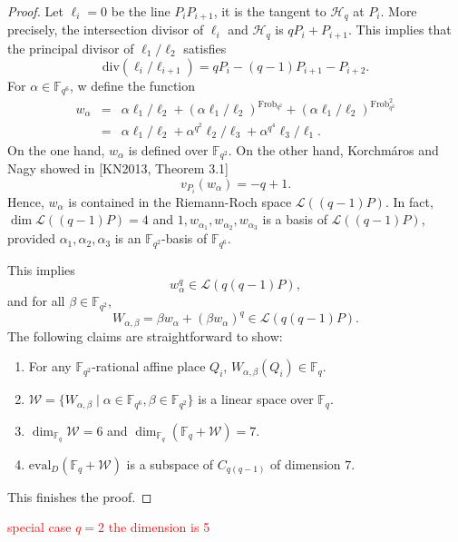 \documentclass[a4paper]{amsart}
\theoremstyle{plain}
\theoremstyle{definition}
\theoremstyle{remark}
\begin{document}
\begin{proof}
	Let $\ell_i=0$ be the line $P_iP_{i+1}$, it is the tangent to $\mathscr{H}_q$ at $P_i$. More precisely, the intersection divisor of $\ell_i$ and $\mathscr{H}_q$ is $qP_i+P_{i+1}$. This implies that the principal divisor of $\ell_1/\ell_2$ satisfies
	\[\mathrm{div}(\ell_i/\ell_{i+1})=qP_i-(q-1)P_{i+1}-P_{i+2}.\]
	For $\alpha \in \mathbb{F}_{q^6}$, w define the function
	\begin{eqnarray*}
		w_\alpha&=&\alpha\ell_1/\ell_2+(\alpha\ell_1/\ell_2)^{\mathrm{Frob}_{q^2}}+(\alpha\ell_1/\ell_2)^{\mathrm{Frob}_{q^2}^2}\\
		&=&\alpha\ell_1/\ell_2+\alpha^{q^2}\ell_2/\ell_3+\alpha^{q^4}\ell_3/\ell_1.
	\end{eqnarray*}
	On the one hand, $w_\alpha$ is defined over $\mathbb{F}_{q^2}$. On the other hand, Korchm\'aros and Nagy showed in [KN2013, Theorem 3.1]
	\[v_{P_i}(w_\alpha)=-q+1.\]
	Hence, $w_\alpha$ is contained in the Riemann-Roch space $\mathcal{L}((q-1)P)$. In fact, $\dim\mathcal{L}((q-1)P)=4$ and $1,w_{\alpha_1}, w_{\alpha_2}, w_{\alpha_3}$ is a basis of $\mathcal{L}((q-1)P)$, provided $\alpha_1,\alpha_2,\alpha_3$ is an $\mathbb{F}_{q^2}$-basis of $\mathbb{F}_{q^6}$. 
	
	This implies
	\[w_\alpha^q\in \mathcal{L}(q(q-1)P),\]
	and for all $\beta \in \mathbb{F}_{q^2}$, 
	\[W_{\alpha,\beta}=\beta w_\alpha +(\beta w_\alpha)^q\in \mathcal{L}(q(q-1)P).\]
	The following claims are straightforward to show:
	\begin{enumerate}
		\item For any $\mathbb{F}_{q^2}$-rational affine place $Q_i$, $W_{\alpha,\beta}(Q_i)\in \mathbb{F}_q$.
		\item $\mathcal{W}=\{W_{\alpha,\beta} \mid \alpha \in \mathbb{F}_{q^6}, \beta \in \mathbb{F}_{q^2}\}$ is a linear space over $\mathbb{F}_q$.
		\item $\dim_{\mathbb{F}_q}\mathcal{W}=6$ and $\dim_{\mathbb{F}_q}(\mathbb{F}_q+ \mathcal{W})=7$.
		\item $\mathrm{eval}_D(\mathbb{F}_q+ \mathcal{W})$ is a subspace of $C_{q(q-1)}$ of dimension $7$.
	\end{enumerate}
	This finishes the proof.
	
	
\end{proof}


\textcolor{red}{special case $q=2$ the dimension is 5 }



\newpage


\end{document}

